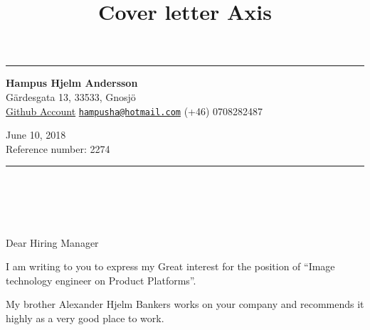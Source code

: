 \documentclass[]{article}
\title{Cover letter Axis}
\author{}
\date{}
\begin{document}
\maketitle

\begin{center}\rule{0.77\paperwidth}{\linethickness}\end{center}

\textbf{Hampus Hjelm Andersson}\\
Gärdesgata 13, 33533, Gnosjö\\
\href{https://github.com/HHA123/Job/}{Github Account}
\textbar{}\textbar{}
\href{mailto:hampusha@hotmail.com}{\nolinkurl{hampusha@hotmail.com}}
\textbar{}\textbar{} (+46) 0708282487

June 10, 2018\\
Reference number: 2274

\begin{center}\rule{0.77\paperwidth}{\linethickness}\end{center}

\hypertarget{section}{%
\section{\texorpdfstring{\\
}{ }}\label{section}}

Dear Hiring Manager

I am writing to you to express my Great interest for the position of
``Image technology engineer on Product Platforms''.

My brother Alexander Hjelm Bankers works on your company and recommends
it highly as a very good place to work.
\end{document}
